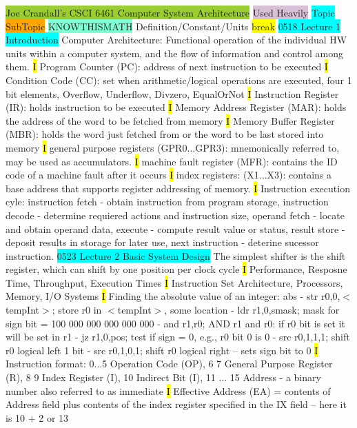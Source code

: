\documentclass[fontsize=4pt]{scrartcl}
\begin{document}
\colorbox{YellowGreen}{Joe Crandall's CSCI 6461 Computer System Architecture}
\colorbox{Thistle}{Used Heavily}
\colorbox{Cyan}{Topic}
\colorbox{Orange}{SubTopic}
\colorbox{Aquamarine}{KNOWTHISMATH}
\colorbox{RubineRed}{Definition/Constant/Units}
\colorbox{Yellow}{break}
\colorbox{Cyan}{0518 Lecture 1 Introduction} 
Computer Architecture: Functional operation of the individual HW units within a computer system, and the flow of information and control among them.
\hl{I} 
Program Counter (PC): address of next instruction to be executed
\hl{I}
Condition Code (CC): set when arithmetic/logical operations are executed, four 1 bit elements, Overflow, Underflow, Divzero, EqualOrNot
\hl{I}
Instruction Register (IR): holds instruction to be executed
\hl{I}
Memory Address Register (MAR): holds the address of the word  to be fetched from memory
\hl{I}
Memory Buffer Register (MBR): holds the word just fetched from or the word to be last stored into memory
\hl{I}
general purpose registers (GPR0$\ldots$GPR3): mnemonically referred to, may be used as accumulators.
\hl{I}
machine fault register (MFR): contains the ID code of a machine fault after it occurs
\hl{I}
index registers: (X1$\ldots$X3): contains a base address that supports register addressing of memory.
\hl{I}
Instruction execution cyle: instruction fetch - obtain instruction from program storage, instruction decode - determine requiered actions and instruction size, operand fetch - locate and obtain operand data, execute - compute result value or status, result store - deposit results in storage for later use, next instruction - deterine sucessor instruction.
\colorbox{Cyan}{0523 Lecture 2 Basic System Design}
The simplest shifter is the shift register, which can shift by one position per clock cycle
\hl{I}
Performance, Resposne Time, Throughput, Execution Times
\hl{I}
Instruction Set Architecture, Processors, Memory, I/O Systems
\hl{I}
Finding the absolute value of an integer: abs - str	r0,0,$<$tempInt$>$; store r0 in $<$tempInt$>$, some location - ldr	r1,0,smask; mask for sign bit = 100 000 000 000 000 000 - and r1,r0; AND r1 and r0: if r0 bit is set it will be set in r1 - jz r1,0,pos; test if sign = 0, e.g., r0 bit 0 is 0 - src r0,1,1,1; shift r0 logical left 1 bit - src r0,1,0,1; shift r0 logical right – sets sign bit to 0
\hl{I}
Instruction format: 0...5 Operation Code (OP), 6 7 General Purpose Register (R), 8 9 Index Register (I), 10 Indirect Bit (I), 11 ... 15 Address - a binary number also referred to as immediate
\hl{I}
Effective Address (EA) = contents of Address field plus contents of the index register specified in the IX field – here it is 10 + 2 or 13
\end{document}
